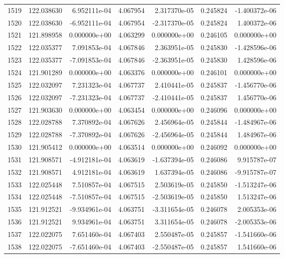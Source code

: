 \begin{tabular}{rrrrrrr}
1519 & 122.038630 &  6.952111e-04 &  4.067954 &  2.317370e-05 &    0.245824 & -1.400372e-06 \\
1520 & 122.038630 & -6.952111e-04 &  4.067954 & -2.317370e-05 &    0.245824 &  1.400372e-06 \\
1521 & 121.898958 &  0.000000e+00 &  4.063299 &  0.000000e+00 &    0.246105 &  0.000000e+00 \\
1522 & 122.035377 &  7.091853e-04 &  4.067846 &  2.363951e-05 &    0.245830 & -1.428596e-06 \\
1523 & 122.035377 & -7.091853e-04 &  4.067846 & -2.363951e-05 &    0.245830 &  1.428596e-06 \\
1524 & 121.901289 &  0.000000e+00 &  4.063376 &  0.000000e+00 &    0.246101 &  0.000000e+00 \\
1525 & 122.032097 &  7.231323e-04 &  4.067737 &  2.410441e-05 &    0.245837 & -1.456770e-06 \\
1526 & 122.032097 & -7.231323e-04 &  4.067737 & -2.410441e-05 &    0.245837 &  1.456770e-06 \\
1527 & 121.903630 &  0.000000e+00 &  4.063454 &  0.000000e+00 &    0.246096 &  0.000000e+00 \\
1528 & 122.028788 &  7.370892e-04 &  4.067626 &  2.456964e-05 &    0.245844 & -1.484967e-06 \\
1529 & 122.028788 & -7.370892e-04 &  4.067626 & -2.456964e-05 &    0.245844 &  1.484967e-06 \\
1530 & 121.905412 &  0.000000e+00 &  4.063514 &  0.000000e+00 &    0.246092 &  0.000000e+00 \\
1531 & 121.908571 & -4.912181e-04 &  4.063619 & -1.637394e-05 &    0.246086 &  9.915787e-07 \\
1532 & 121.908571 &  4.912181e-04 &  4.063619 &  1.637394e-05 &    0.246086 & -9.915787e-07 \\
1533 & 122.025448 &  7.510857e-04 &  4.067515 &  2.503619e-05 &    0.245850 & -1.513247e-06 \\
1534 & 122.025448 & -7.510857e-04 &  4.067515 & -2.503619e-05 &    0.245850 &  1.513247e-06 \\
1535 & 121.912521 & -9.934961e-04 &  4.063751 & -3.311654e-05 &    0.246078 &  2.005353e-06 \\
1536 & 121.912521 &  9.934961e-04 &  4.063751 &  3.311654e-05 &    0.246078 & -2.005353e-06 \\
1537 & 122.022075 &  7.651460e-04 &  4.067403 &  2.550487e-05 &    0.245857 & -1.541660e-06 \\
1538 & 122.022075 & -7.651460e-04 &  4.067403 & -2.550487e-05 &    0.245857 &  1.541660e-06 \\

\end{tabular}
